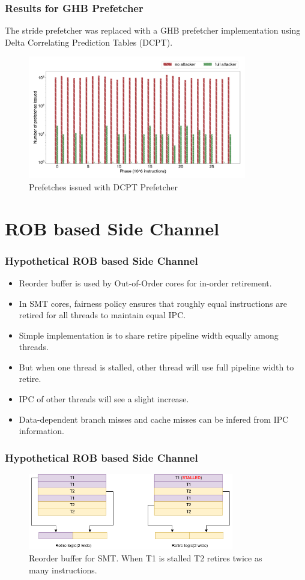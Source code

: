 \documentclass[10pt,usenames,dvipsnames]{beamer}
\begin{document}
\begin{frame}
\frametitle{Results for GHB Prefetcher}
The stride prefetcher was replaced with a GHB prefetcher implementation
using Delta Correlating Prediction Tables (DCPT).
\begin{figure}[ht]
    \centering
    \includegraphics[width=0.85\textwidth]{dcpt-hwpf}
    \caption{Prefetches issued with DCPT Prefetcher}
\end{figure}
\end{frame}

\section{ROB based Side Channel}
\begin{frame}
\frametitle{Hypothetical ROB based Side Channel}
\begin{itemize}
    \item Reorder buffer is used by Out-of-Order cores for in-order retirement.
    \item In SMT cores, fairness policy ensures that roughly equal instructions are retired for all threads to maintain equal IPC.
    \item Simple implementation is to share retire pipeline width equally among threads.
    \item But when one thread is stalled, other thread will use full pipeline width to retire.
    \item IPC of other threads will see a slight increase.
    \item Data-dependent branch misses and cache misses can be infered from IPC information.
\end{itemize}
\end{frame}

\begin{frame}
\frametitle{Hypothetical ROB based Side Channel}
\begin{figure}
\centering
\includegraphics[width=0.8\textwidth]{rob_side_channel}
\caption{Reorder buffer for SMT. When T1 is stalled T2 retires twice as many instructions.}
\end{figure}
\end{frame}
\end{document}
